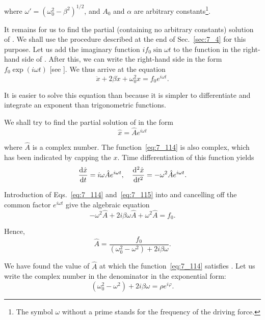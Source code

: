 \noindent
where $\omega'=\left(\omega_0^2 - \beta^2\right)^{1/2}$, and $A_0$ and $\alpha$ are arbitrary constants\footnote{The symbol $\omega$ without a prime stands for the frequency of the driving force.}.

It remains for us to find the partial (containing no arbitrary constants) solution of . We shall use the procedure described at the end of Sec.~\ref{sec:7_4} for this purpose. Let us add the imaginary function $if_0\sin\omega t$ to the function in the right-hand side of . After this, we can write the right-hand side in the form $f_0\exp(i\omega t)$ [see ]. We thus arrive at the equation
\begin{equation}\label{eq:7_113}
	\ddot{x} + 2\beta\dot{x} + \omega_0^2 x = f_0 e^{i\omega t}.
\end{equation}

\noindent
It is easier to solve this equation than  because it is simpler to differentiate and integrate an exponent than trigonometric functions.

We shall try to find the partial solution of  in the form
\begin{equation}\label{eq:7_114}
	\hat{x} = \hat{A} e^{i\omega t}
\end{equation}

\noindent
where $\hat{A}$ is a complex number. The function~\eqref{eq:7_114} is also complex, which has been indicated by capping the $x$. Time differentiation of this function yields
\begin{equation}\label{eq:7_115}
	\frac{\mathrm{d}\hat{x}}{\mathrm{d} t} = i\omega \hat{A} e^{i\omega t},\quad \frac{\mathrm{d}^2\hat{x}}{\mathrm{d} t^2} = -\omega^2 \hat{A} e^{i\omega t}.
\end{equation}

\noindent
Introduction of Eqs.~\eqref{eq:7_114} and~\eqref{eq:7_115} into  and cancelling off the common factor $e^{i\omega t}$ give the algebraic equation
\begin{equation*}
	- \omega^2 \hat{A} + 2i\beta\omega\hat{A} + \omega^2\hat{A} = f_0.
\end{equation*}

\noindent
Hence,
\begin{equation}\label{eq:7_116}
	\hat{A} = \frac{f_0}{\left(\omega_0^2 - \omega^2\right) + 2i\beta\omega}.
\end{equation}

\noindent
We have found the value of $\hat{A}$ at which the function~\eqref{eq:7_114} satisfies . Let us write the complex number in the denominator in the exponential form:
\begin{equation}\label{eq:7_117}
	\left(\omega_0^2 - \omega^2\right) + 2i\beta\omega = \rho e^{i\varphi}.
\end{equation}

